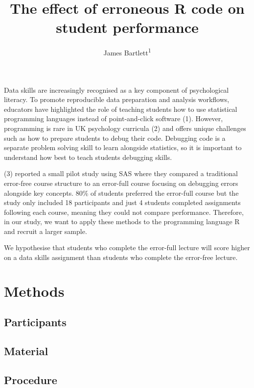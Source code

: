\documentclass[
  man]{apa6}
\title{The effect of erroneous R code on student performance}
\author{James Bartlett\textsuperscript{1}}
\date{}
\affiliation{\vspace{0.5cm}\textsuperscript{1} University of Glasgow, United Kingdom}
\begin{document}
\maketitle

Data skills are increasingly recognised as a key component of psychological literacy. To promote reproducible data preparation and analysis workflows, educators have highlighted the role of teaching students how to use statistical programming languages instead of point-and-click software (1). However, programming is rare in UK psychology curricula (2) and offers unique challenges such as how to prepare students to debug their code. Debugging code is a separate problem solving skill to learn alongside statistics, so it is important to understand how best to teach students debugging skills.

(3) reported a small pilot study using SAS where they compared a traditional error-free course structure to an error-full course focusing on debugging errors alongside key concepts. 80\% of students preferred the error-full course but the study only included 18 participants and just 4 students completed assignments following each course, meaning they could not compare performance. Therefore, in our study, we want to apply these methods to the programming language R and recruit a larger sample.

We hypothesise that students who complete the error-full lecture will score higher on a data skills assignment than students who complete the error-free lecture.

\hypertarget{methods}{%
\section{Methods}\label{methods}}

\hypertarget{participants}{%
\subsection{Participants}\label{participants}}

\hypertarget{material}{%
\subsection{Material}\label{material}}

\hypertarget{procedure}{%
\subsection{Procedure}\label{procedure}}
\end{document}
